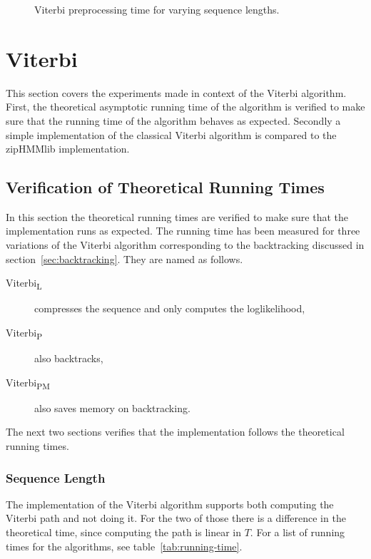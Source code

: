 \begin{figure}
  \centering
  
  \caption{Viterbi preprocessing time for varying sequence lengths.}
  \label{fig:pre_viterbi_T}
\end{figure}

\section{Viterbi}

This section covers the experiments made in context of the Viterbi algorithm.
First, the theoretical asymptotic running time of the algorithm is verified to
make sure that the running time of the algorithm behaves as expected. Secondly
a simple implementation of the classical Viterbi algorithm is compared to the
zipHMMlib implementation.

\subsection{Verification of Theoretical Running Times}
\label{sec:theor-runn-times}

In this section the theoretical running times are verified to make sure that
the implementation runs as expected. The running time has been measured for
three variations of the Viterbi algorithm corresponding to the backtracking
discussed in section~\ref{sec:backtracking}. They are named as follows.
\begin{description}
\item[Viterbi\textsubscript{L}] compresses the sequence and only computes the
  loglikelihood,
\item[Viterbi\textsubscript{P}] also backtracks,
\item[Viterbi\textsubscript{PM}] also saves memory on backtracking.
\end{description}
The next two sections verifies that the implementation follows the theoretical
running times.

\subsubsection{Sequence Length}

The implementation of the Viterbi algorithm supports both computing the Viterbi
path and not doing it. For the two of those there is a difference in the
theoretical time, since computing the path is linear in $T$. For a list of
running times for the algorithms, see table~\ref{tab:running-time}.

